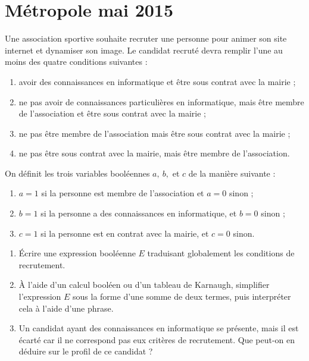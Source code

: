 \documentclass[a4paper,12pt]{article}
\begin{document}

\section*{Métropole mai 2015}
Une association sportive souhaite recruter une personne pour animer son site internet et dynamiser
son image. Le candidat recruté devra remplir l'une au moins des quatre conditions suivantes :


\begin{enumerate}[--]
    \item avoir des connaissances en informatique et être sous contrat avec la mairie ;
    \item ne pas avoir de connaissances particulières en informatique, mais être membre de l'association
    et être sous contrat avec la mairie ;
    \item ne pas être membre de l'association mais être sous contrat avec la mairie ;
    \item ne pas être sous contrat avec la mairie, mais être membre de l'association.\\
\end{enumerate}

On définit les trois variables booléennes $a,\: b,$ et $c$ de la manière suivante :


\begin{enumerate}[--]
    \item $a = 1$ si la personne est membre de l'association et $a =  0$ sinon ;
    \item $b = 1$ si la personne a des connaissances en informatique, et $b = 0$ sinon ;
    \item $c = 1$ si la personne est en contrat avec la mairie, et $c = 0$ sinon.\\
\end{enumerate}

\begin{enumerate}[\bfseries 1.]
    \item Écrire une expression booléenne $E$ traduisant globalement les  conditions de recrutement.
    \item À l'aide d'un calcul booléen ou d'un tableau de Karnaugh, simplifier l'expression $E$ sous la
    forme d'une somme de deux termes, puis interpréter cela à l'aide d'une phrase.
    \item Un candidat ayant des connaissances en informatique se présente, mais il est écarté car il ne
    correspond pas eux critères de recrutement.
    Que peut-on en déduire sur le profil de ce candidat ?
\end{enumerate}
\end{document}
